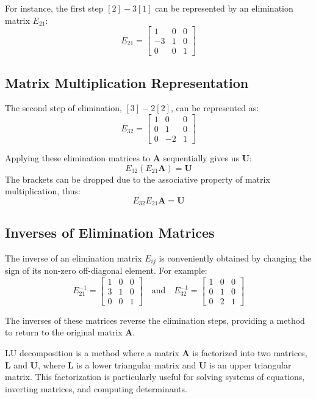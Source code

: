 For instance, the first step \([2] - 3[1]\) can be represented by an elimination matrix \(E_{21}\):
\[
E_{21} =
\begin{bmatrix}
    1 & 0 & 0 \\
    -3 & 1 & 0 \\
    0 & 0 & 1
\end{bmatrix}
\]

\subsection*{Matrix Multiplication Representation}

The second step of elimination, \([3] - 2[2]\), can be represented as:
\[
E_{32} =
\begin{bmatrix}
    1 & 0 & 0 \\
    0 & 1 & 0 \\
    0 & -2 & 1
\end{bmatrix}
\]

Applying these elimination matrices to \( \mathbf{A} \) sequentially gives us \( \mathbf{U} \):
\[
E_{32}(E_{21}\mathbf{A}) = \mathbf{U}
\]
The brackets can be dropped due to the associative property of matrix multiplication, thus:
\[
E_{32}E_{21}\mathbf{A} = \mathbf{U}
\]

\subsection*{Inverses of Elimination Matrices}

The inverse of an elimination matrix \(E_{ij}\) is conveniently obtained by changing the sign of its non-zero off-diagonal element. For example:
\[
E_{21}^{-1} =
\begin{bmatrix}
    1 & 0 & 0 \\
    3 & 1 & 0 \\
    0 & 0 & 1
\end{bmatrix}
\quad \text{and} \quad
E_{32}^{-1} =
\begin{bmatrix}
    1 & 0 & 0 \\
    0 & 1 & 0 \\
    0 & 2 & 1
\end{bmatrix}
\]

The inverses of these matrices reverse the elimination steps, providing a method to return to the original matrix \( \mathbf{A} \).

LU decomposition is a method where a matrix \( \mathbf{A} \) is factorized into two matrices, \( \mathbf{L} \) and \( \mathbf{U} \), where \( \mathbf{L} \) is a lower triangular matrix and \( \mathbf{U} \) is an upper triangular matrix. This factorization is particularly useful for solving systems of equations, inverting matrices, and computing determinants.

